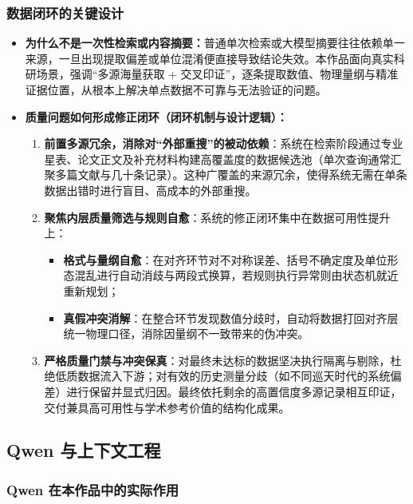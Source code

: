 \subsubsection{数据闭环的关键设计}

\begin{itemize}[leftmargin=1.2em,itemsep=2pt]
\item \textbf{为什么不是一次性检索或内容摘要：}普通单次检索或大模型摘要往往依赖单一来源，一旦出现提取偏差或单位混淆便直接导致结论失效。本作品面向真实科研场景，强调“多源海量获取 + 交叉印证”，逐条提取数值、物理量纲与精准证据位置，从根本上解决单点数据不可靠与无法验证的问题。
\item \textbf{质量问题如何形成修正闭环（闭环机制与设计逻辑）：}
\begin{enumerate}[leftmargin=1.6em,itemsep=1pt]
\item \textbf{前置多源冗余，消除对“外部重搜”的被动依赖}：系统在检索阶段通过专业星表、论文正文及补充材料构建高覆盖度的数据候选池（单次查询通常汇聚多篇文献与几十条记录）。这种广覆盖的来源冗余，使得系统无需在单条数据出错时进行盲目、高成本的外部重搜。
\item \textbf{聚焦内层质量筛选与规则自愈}：系统的修正闭环集中在数据可用性提升上：
\begin{itemize}[leftmargin=1.2em,itemsep=1pt]
\item \textbf{格式与量纲自愈}：在对齐环节对不对称误差、括号不确定度及单位形态混乱进行自动消歧与两段式换算，若规则执行异常则由状态机就近重新规划；
\item \textbf{真假冲突消解}：在整合环节发现数值分歧时，自动将数据打回对齐层统一物理口径，消除因量纲不一致带来的伪冲突。
\end{itemize}
\item \textbf{严格质量门禁与冲突保真}：对最终未达标的数据坚决执行隔离与剔除，杜绝低质数据流入下游；对有效的历史测量分歧（如不同巡天时代的系统偏差）进行保留并显式归因。最终依托剩余的高置信度多源记录相互印证，交付兼具高可用性与学术参考价值的结构化成果。
\end{enumerate}
\end{itemize}

\subsection{Qwen 与上下文工程}

\subsubsection{Qwen 在本作品中的实际作用}

